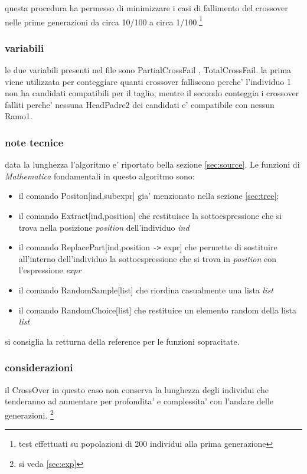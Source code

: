 \documentclass[12pt, a4paper]{article}
\begin{document}
questa procedura ha permesso di minimizzare i casi di fallimento del crossover nelle prime generazioni da circa 10/100 a circa 1/100.\footnote{test effettuati su popolazioni di 200 individui alla prima generazione}

\subsubsection{variabili}
le due variabili presenti nel file sono PartialCrossFail , TotalCrossFail. la prima viene utilizzata per conteggiare quanti crossover falliscono perche' l'individuo 1 non ha candidati compatibili per il taglio, mentre il secondo conteggia i crossover falliti perche' nessuna HeadPadre2 dei candidati e' compatibile con nessun Ramo1.

\subsubsection{note tecnice}
data la lunghezza l'algoritmo e' riportato bella sezione \ref{sec:source}.
Le funzioni di {\itshape Mathematica} fondamentali in questo algoritmo sono: 
\begin{itemize}
\item il comando Positon[ind,subexpr] gia' menzionato nella sezione \ref{sec:tree}; 
\item il comando Extract[ind,position] che restituisce la sottoespressione che si trova nella posizione {\itshape position} dell'individuo {\itshape ind}
\item il comando ReplacePart[ind,position \verb|->| expr] che permette di sostituire all'interno dell'individuo la sottoespressione che si trova in {\itshape position} con l'espressione {\itshape expr}
\item il comando RandomSample[list] che riordina casualmente una lista {\itshape list}
\item il comando RandomChoice[list] che restituice un elemento random della lista {\itshape list}
\end{itemize}

si consiglia la retturna della reference per le funzioni sopracitate. 

\subsubsection{considerazioni}
il CrossOver in questo caso non conserva la lunghezza degli individui che tenderanno ad aumentare per profondita' e complessita' con l'andare delle generazioni.
\footnote{si veda \ref{sec:exp}}
\end{document}

